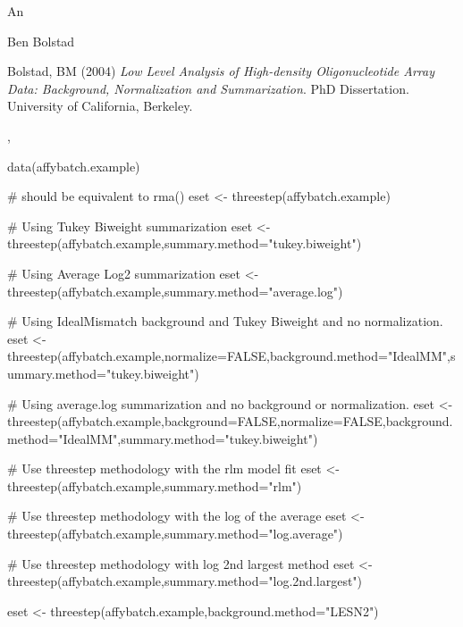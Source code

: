 \begin{Value}
An 
\end{Value}
\begin{Author}\relax
Ben Bolstad 
\end{Author}
\begin{References}\relax
Bolstad, BM (2004) \emph{Low Level Analysis of High-density
Oligonucleotide Array Data: Background, Normalization and
Summarization}. PhD Dissertation. University of California, Berkeley.
\end{References}
\begin{SeeAlso}\relax
{}, 
\end{SeeAlso}
\begin{Examples}
\begin{ExampleCode}
data(affybatch.example)

# should be equivalent to rma()
eset <- threestep(affybatch.example)

# Using Tukey Biweight summarization
eset <- threestep(affybatch.example,summary.method="tukey.biweight")

# Using Average Log2 summarization
eset <- threestep(affybatch.example,summary.method="average.log")

# Using IdealMismatch background and Tukey Biweight and no normalization.
eset <- threestep(affybatch.example,normalize=FALSE,background.method="IdealMM",summary.method="tukey.biweight")

# Using average.log summarization and no background or normalization.
eset <- threestep(affybatch.example,background=FALSE,normalize=FALSE,background.method="IdealMM",summary.method="tukey.biweight")

# Use threestep methodology with the rlm model fit
eset <- threestep(affybatch.example,summary.method="rlm")

# Use threestep methodology with the log of the average
eset <- threestep(affybatch.example,summary.method="log.average")

# Use threestep methodology with log 2nd largest method
eset <- threestep(affybatch.example,summary.method="log.2nd.largest")

eset <- threestep(affybatch.example,background.method="LESN2")
\end{ExampleCode}
\end{Examples}

